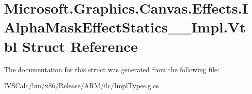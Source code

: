 \hypertarget{struct_microsoft_1_1_graphics_1_1_canvas_1_1_effects_1_1_i_alpha_mask_effect_statics_____impl_1_1_vtbl}{}\section{Microsoft.\+Graphics.\+Canvas.\+Effects.\+I\+Alpha\+Mask\+Effect\+Statics\+\_\+\+\_\+\+Impl.\+Vtbl Struct Reference}
\label{struct_microsoft_1_1_graphics_1_1_canvas_1_1_effects_1_1_i_alpha_mask_effect_statics_____impl_1_1_vtbl}


The documentation for this struct was generated from the following file\+:\begin{DoxyCompactItemize}
\item 
I\+V\+S\+Calc/bin/x86/\+Release/\+A\+R\+M/ilc/Impl\+Types.\+g.\+cs\end{DoxyCompactItemize}
